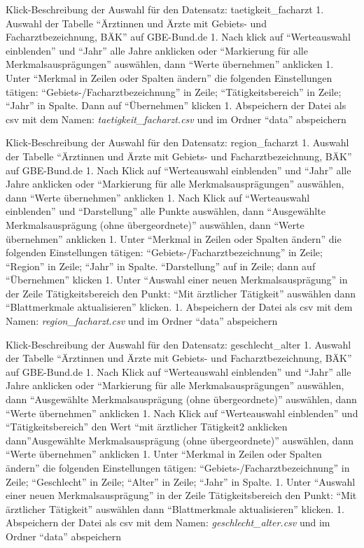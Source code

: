 \documentclass[
  ngerman,
  number,
  preprint,
  3p,
  twocolumn]{elsarticle}
\begin{document}
Klick-Beschreibung der Auswahl für den Datensatz: taetigkeit\_facharzt
1. Auswahl der Tabelle ``Ärztinnen und Ärzte mit Gebiets- und
Facharztbezeichnung, BÄK'' auf GBE-Bund.de 1. Nach klick auf
``Werteauswahl einblenden'' und ``Jahr'' alle Jahre anklicken oder
``Markierung für alle Merkmalsausprägungen'' auswählen, dann ``Werte
übernehmen'' anklicken 1. Unter ``Merkmal in Zeilen oder Spalten
ändern'' die folgenden Einstellungen tätigen:
``Gebiets-/Facharztbezeichnung'' in Zeile; ``Tätigkeitsbereich'' in
Zeile; ``Jahr'' in Spalte. Dann auf ``Übernehmen'' klicken 1.
Abspeichern der Datei als csv mit dem Namen:
\emph{taetigkeit\_facharzt.csv} und im Ordner ``data'' abspeichern

Klick-Beschreibung der Auswahl für den Datensatz: region\_facharzt 1.
Auswahl der Tabelle ``Ärztinnen und Ärzte mit Gebiets- und
Facharztbezeichnung, BÄK'' auf GBE-Bund.de 1. Nach Klick auf
``Werteauswahl einblenden'' und ``Jahr'' alle Jahre anklicken oder
``Markierung für alle Merkmalsausprägungen'' auswählen, dann ``Werte
übernehmen'' anklicken 1. Nach Klick auf ``Werteauswahl einblenden'' und
``Darstellung'' alle Punkte auswählen, dann ``Ausgewählte
Merkmalsausprägung (ohne übergeordnete)'' auswählen, dann ``Werte
übernehmen'' anklicken 1. Unter ``Merkmal in Zeilen oder Spalten
ändern'' die folgenden Einstellungen tätigen:
``Gebiets-/Facharztbezeichnung'' in Zeile; ``Region'' in Zeile; ``Jahr''
in Spalte. ``Darstellung'' auf in Zeile; dann auf ``Übernehmen'' klicken
1. Unter ``Auswahl einer neuen Merkmalsausprägung'' in der Zeile
Tätigkeitsbereich den Punkt: ``Mit ärztlicher Tätigkeit'' auswählen dann
``Blattmerkmale aktualisieren'' klicken. 1. Abspeichern der Datei als
csv mit dem Namen: \emph{region\_facharzt.csv} und im Ordner ``data''
abspeichern

Klick-Beschreibung der Auswahl für den Datensatz: geschlecht\_alter 1.
Auswahl der Tabelle ``Ärztinnen und Ärzte mit Gebiets- und
Facharztbezeichnung, BÄK'' auf GBE-Bund.de 1. Nach Klick auf
``Werteauswahl einblenden'' und ``Jahr'' alle Jahre anklicken oder
``Markierung für alle Merkmalsausprägungen'' auswählen, dann
``Ausgewählte Merkmalsausprägung (ohne übergeordnete)'' auswählen, dann
``Werte übernehmen'' anklicken 1. Nach Klick auf ``Werteauswahl
einblenden'' und ``Tätigkeitsbereich'' den Wert ``mit ärztlicher
Tätigkeit2 anklicken dann''Ausgewählte Merkmalsausprägung (ohne
übergeordnete)'' auswählen, dann ``Werte übernehmen'' anklicken 1. Unter
``Merkmal in Zeilen oder Spalten ändern'' die folgenden Einstellungen
tätigen: ``Gebiets-/Facharztbezeichnung'' in Zeile; ``Geschlecht'' in
Zeile; ``Alter'' in Zeile; ``Jahr'' in Spalte. 1. Unter ``Auswahl einer
neuen Merkmalsausprägung'' in der Zeile Tätigkeitsbereich den Punkt:
``Mit ärztlicher Tätigkeit'' auswählen dann ``Blattmerkmale
aktualisieren'' klicken. 1. Abspeichern der Datei als csv mit dem Namen:
\emph{geschlecht\_alter.csv} und im Ordner ``data'' abspeichern
\end{document}
